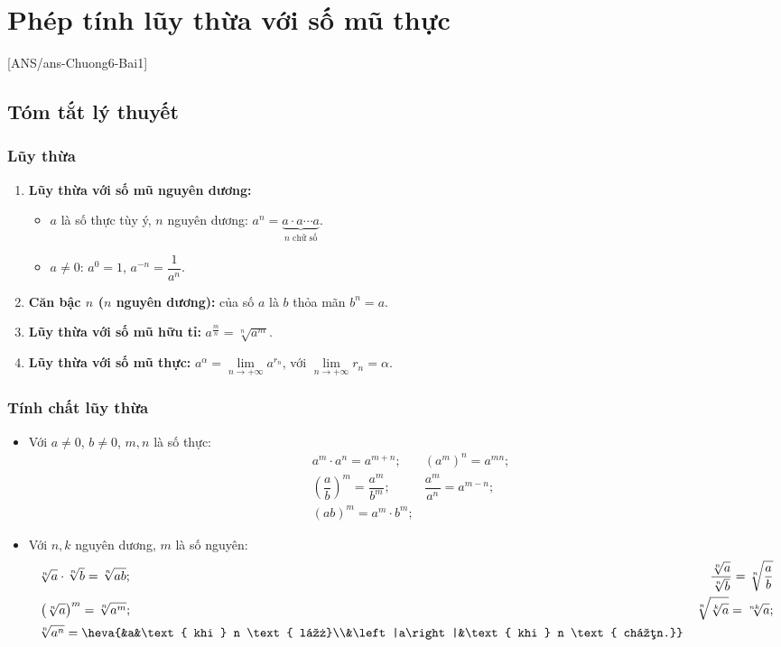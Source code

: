 \setcounter{chapter}{5}
\setcounter{section}{17}
\setcounter{subsubsection}{0}
\setcounter{ex}{0}
\setcounter{bt}{0}
\section{Phép tính lũy thừa với số mũ thực}

[ANS/ans-Chuong6-Bai1]

\subsection{Tóm tắt lý thuyết}
\begin{tomtat}
	\subsubsection{Lũy thừa}
	\begin{enumerate}
		\item \textbf{Lũy thừa với số mũ nguyên dương:}
		\begin{itemize}
			\item $a$ là số thực tùy ý, $n$ nguyên dương: $a^n=\underbrace{a\cdot a\cdots a}_{n \text{ chữ số}}.$
			\item $a\ne 0$: $a^0=1$, $a^{-n}=\dfrac{1}{a^n}$.
		\end{itemize}
		\item \textbf{Căn bậc $n$ ($n$ nguyên dương):} của số $a$ là $b$ thỏa mãn $b^n=a$.
		\item \textbf{Lũy thừa với số mũ hữu tỉ:} $a^{\frac{m}{n}}=\sqrt[n]{a^m}$.
		\item \textbf{Lũy thừa với số mũ thực:} $a^{\alpha}=\lim\limits_{n \to +\infty} a^{r_n}$, với $\lim\limits_{n \to +\infty} r_n=\alpha$.
	\end{enumerate}
	\subsubsection{Tính chất lũy thừa}
	\begin{itemize}
		\item Với $a\ne 0$, $b\ne 0$, $m, n$ là số thực:
		\begin{eqnarray*}
			&a^m\cdot a^n=a^{m+n}; &\left(a^m\right)^n=a^{mn};\\
			&\left(\dfrac{a}{b}\right)^m=\dfrac{a^m}{b^m}; &\dfrac{a^m}{a^n}=a^{m-n};\\
			&(ab)^m=a^m\cdot b^m; &
		\end{eqnarray*}
		\item Với $n, k$ nguyên dương, $m$ là số nguyên:
		\begin{eqnarray*}
			& \sqrt[n]{a}\cdot \sqrt[n]{b}=\sqrt[n]{ab};& \dfrac{\sqrt[n]{a}}{\sqrt[n]{b}}=\sqrt[n]{\dfrac{a}{b}}\\
			&\left(\sqrt[n]{a}\right)^m=\sqrt[n]{a^m};&\sqrt[n]{\sqrt[k]{a}}=\sqrt[nk]{a};\\
			&\sqrt[n]{a^n}=\heva{&a&\text{ khi } n \text{ lẻ}\\&\left|a\right|&\text{ khi } n \text{ chẵn.}}&
		\end{eqnarray*}
	\end{itemize}
\end{tomtat}
\setcounter{subsubsection}{0}
\setcounter{ex}{0}
\setcounter{bt}{0}
